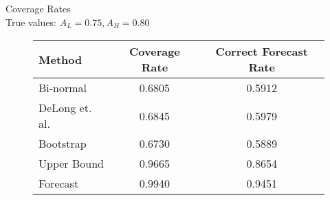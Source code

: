


Coverage Rates \\
True values: $A_L = 0.75, A_H = 0.80$

\begin{figure}[h!]

\begin{center}


    \begin{tabular}{l c c }

    Method & Coverage Rate & Correct Forecast Rate \\

    \hline



          Bi-normal &  0.6805 & 0.5912 \\
     DeLong et. al. &  0.6845 & 0.5979 \\
          Bootstrap &  0.6730 & 0.5889 \\
        Upper Bound &  0.9665 & 0.8654 \\
           Forecast &  0.9940 & 0.9451 \\

    \hline

    \end{tabular}


\end{center}

%





\end{figure}



